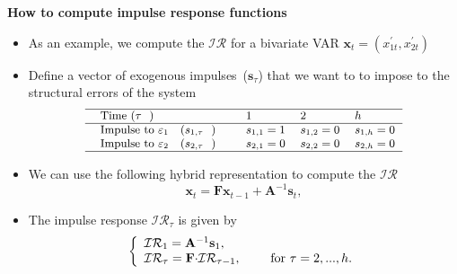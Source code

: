 \documentclass[10pt,handout]{beamer}
\begin{document}
\vspace{0.1cm}

\begin{frame}
{\textbf{How to compute {impulse response functions}}}

\begin{itemize}
\item As an example, we compute the $\mathcal{IR}$ for a bivariate VAR $%
\mathbf{x}_{t}=\left( x_{1t}^{\prime },x_{2t}^{\prime }\right) $ \medskip 
\pause

\item Define a vector of exogenous impulses\ ($\mathbf{s}_{\tau }$) that we
want to to impose to the structural errors of the system%
\begin{equation*}
{\small 
\begin{tabular}{lllll}
\hline
$\text{Time (}\tau \text{)}$ &  & $1$ & $2$ & $h$ \\ \hline
$\text{Impulse to }\varepsilon _{1}\text{ (}s_{1,\tau }\text{)}$ &  & $%
s_{1,1}=1$ & $s_{1,2}=0$ & $s_{1,h}=0$ \\ 
$\text{Impulse to }\varepsilon _{2}\text{ (}s_{2,\tau }\text{)}$ &  & $%
s_{2,1}=0$ & $s_{2,2}=0$ & $s_{2,h}=0$ \\ \hline
\end{tabular}%
}
\end{equation*}
\end{itemize}
\end{frame}

\vspace{0.1cm}

\begin{frame}
\begin{itemize}
\item We can use the following hybrid representation to compute the $%
\mathcal{IR}$%
\begin{equation*}
\mathbf{x}_{t}=\mathbf{Fx}_{t-1}+\mathbf{A}^{-1}\mathbf{s}_{t},
\end{equation*}%
\pause

\item The impulse response $\mathcal{IR}_{\tau }$ is given by%
\begin{equation*}
\left\{ 
\begin{array}{l}
\mathcal{IR}_{1}=\mathbf{A}^{-1}\mathbf{s}_{1}, \\ 
\mathcal{IR}_{\tau }=\mathbf{F\cdot }\mathcal{IR}_{\tau -1},\text{ \ \ \ \
for }\tau =2,...,h.%
\end{array}%
\right.
\end{equation*}
\end{itemize}
\end{frame}
\end{document}
